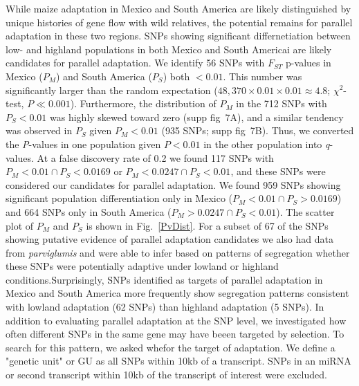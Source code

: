 {{While maize adaptation in Mexico and South America are likely distinguished by unique histories of gene flow with wild relatives, the potential remains for parallel adaptation in these two regions.  
SNPs showing significant differnetiation between low- and highland populations in both Mexico and South Americai are likely candidates for parallel adaptation. 
We identify 56 SNPs with $F_{ST}$ p-values in Mexico ($P_M$) and South America ($P_S$) both $<0.01$.   
This number  was significantly larger than the random expectation ($48,370\times 0.01 \times 0.01 \approx 4.8$; $\chi^2$-test, $P\ll0.001$).  Furthermore, the distribution of $P_M$ in the 712 SNPs with $P_S<0.01$ was highly skewed toward zero (supp fig~7A), and a similar tendency was observed in $P_S$ given $P_M<0.01$ (935 SNPs; supp fig~7B).  Thus, we converted the \emph{P}-values in one population given $P<0.01$ in the other population into \emph{q}-values.  
At a false discovery rate of 0.2 we found 117 SNPs with $P_M<0.01 \cap P_S < 0.0169$ or $P_M<0.0247 \cap P_S < 0.01$, and these SNPs were considered our candidates for parallel adaptation.
We found 959 SNPs showing significant population differentiation only in Mexico ($P_M<0.01 \cap P_S > 0.0169$) and 664 SNPs only in South America  ($P_M>0.0247 \cap P_S < 0.01$).  The scatter plot of $P_M$ and $P_S$ is shown in Fig.~\ref{PvDist}.  
For a subset of 67 of the SNPs showing putative evidence of parallel adaptation candidates we also had data from \emph{parviglumis} and were able to infer based on patterns of segregation whether these SNPs were potentially adaptive under lowland or highland conditions.Surprisingly, SNPs identified as targets of parallel adaptation in Mexico and South America more frequently show segregation patterns consistent with lowland adaptation (62 SNPs) than highland adaptation (5 SNPs). %
%
%
%
In addition to evaluating parallel adaptation at the SNP level, we investigated how often different SNPs in the same gene may have beeen targeted by selection. To search for this pattern, we asked whefor the target of adaptation. We define a "genetic unit" or GU as all SNPs within 10kb of a transcript.  SNPs in an miRNA or second transcript within 10kb of the transcript of interest were excluded.  
}}
